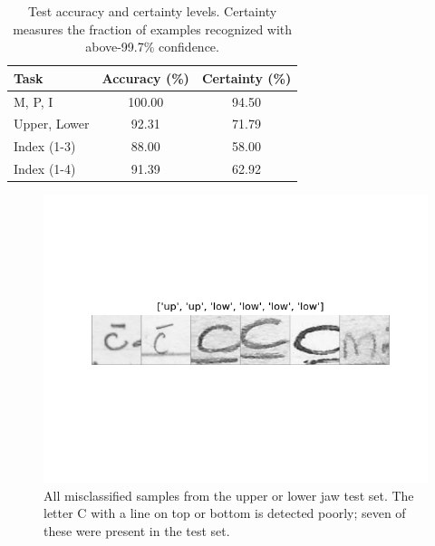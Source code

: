 \documentclass[english,twoside,openright]{UH_DS_MSc}
\begin{document}
\begin{table}[h!]
\centering
\begin{tabular}{|l|c|c|}
\hline
\textbf{Task}       & \textbf{Accuracy (\%)} & \textbf{Certainty (\%)} \\ \hline
M, P, I                 & 100.00                 & 94.50                   \\ \hline
Upper, Lower         & 92.31                  & 71.79                   \\ \hline
Index (1-3)                 & 88.00                  & 58.00                    \\ \hline
Index (1-4)                & 91.39                  & 62.92                   \\ \hline
\end{tabular}
\caption{Test accuracy and certainty levels. Certainty measures the fraction of examples recognized with above-99.7\% confidence.}
\label{tab:task_accuracy_certainty}
\end{table}

\begin{figure}[ht]
    \centering
    \includegraphics*[scale=0.8]{images/misclassified_uplow.png}
    \caption{All misclassified samples from the upper or lower jaw test set. The letter C with a line on top or bottom is detected poorly; seven of these were present in the test set.}
    \label{image:misclassifications_uplow_in_test}
\end{figure}
\end{document}
